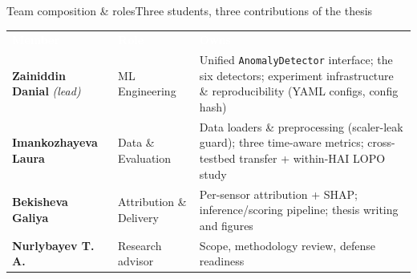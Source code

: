 \documentclass[aspectratio=169,11pt]{beamer}
\begin{document}
\begin{frame}{Team composition \& roles}{Three students, three contributions of the thesis}
\small
\renewcommand{\arraystretch}{1.35}
\begin{tabular}{>{\raggedright\arraybackslash}p{2.6cm} >{\raggedright\arraybackslash}p{2.4cm} >{\raggedright\arraybackslash}p{7.6cm}}
\rowcolor{navy}\textcolor{white}{\textbf{Member}} & \textcolor{white}{\textbf{Role}} & \textcolor{white}{\textbf{Owns}}\\
\rowcolor{rowalt}\textbf{Zainiddin Danial} \textit{(lead)} & ML Engineering & Unified \texttt{AnomalyDetector} interface; the six detectors; experiment infrastructure \& reproducibility (YAML configs, config hash)\\
\textbf{Imankozhayeva Laura} & Data \& Evaluation & Data loaders \& preprocessing (scaler-leak guard); three time-aware metrics; cross-testbed transfer + within-HAI LOPO study\\
\rowcolor{rowalt}\textbf{Bekisheva Galiya} & Attribution \& Delivery & Per-sensor attribution + SHAP; inference/scoring pipeline; thesis writing and figures\\
\textbf{Nurlybayev T.\,A.} & Research advisor & Scope, methodology review, defense readiness\\
\end{tabular}
\end{frame}
\end{document}

